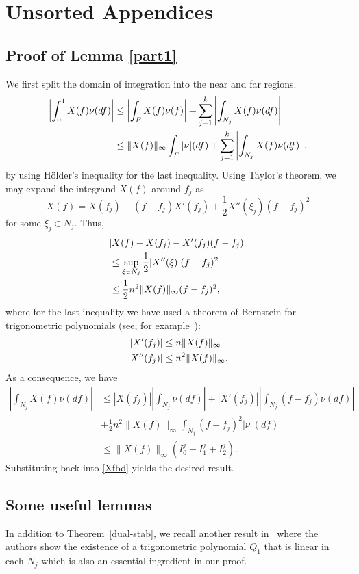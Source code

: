 \section{Unsorted Appendices}
\subsection{Proof of Lemma \ref{part1}}\label{apx:pf:taylor}
We first split the domain of integration into the near and far regions.
\begin{align}
\left |\int_0^1 X(f) \nu(df)\right | 
&\leq \left |\int_F X(f) \nu (f)\right | + \sum_{j=1}^k \left | \int_{N_j}X(f) \nu(df)\right |\nonumber \\
&\leq \lVert X(f)\rVert_\infty \int_F |\nu| (df) + \sum_{j=1}^k \left | \int_{N_j}X(f) \nu(df) \right |.\label{Xfbd}
\end{align}
by using H\"{o}lder's inequality for the last inequality. Using Taylor's theorem, we may expand the integrand $X(f)$ around $f_j$ as
\[
X(f) = X(f_j) + (f-f_j) X'(f_j) + \frac{1}{2} X''(\xi_j) (f-f_j)^2 
\]
for some $\xi_j \in N_j$. 
Thus,
{\small
\begin{align*}
&|X(f)-X(f_j)-X'(f_j)(f-f_j)|\\
&\leq \sup_{\xi \in N_j} \frac{1}{2}|X''(\xi)|(f -f_j)^2\\ &\leq \frac{1}{2} n^2 \lVert X(f)\rVert_\infty(f - f_j)^2, 
\end{align*}
}
where for the last inequality we have used a theorem of Bernstein for trigonometric polynomials (see, for example~\cite{bernstein}):  
\begin{align*}
|X'(f_j)|  & \leq n \lVert X(f)\rVert_\infty\\
|X''(f_j)| & \leq n^2 \lVert X(f)\rVert_\infty.
\end{align*}
As a consequence, we have
\begin{align*}
\left | \int_{N_j} X(f) \nu(df)\right| &\leq \left| X(f_j)\right| \left| \int_{N_j} \nu (df)\right| + \left|X'(f_j)\right| \left|\int_{N_j} (f-f_j) \nu (df)  \right|\\
& + \frac{1}{2} n^2 \|X(f)\|_\infty \int_{N_j} (f-f_j)^2 |\nu| (df) \\
& \leq \|X(f)\|_\infty \left(I_0^j + I_1^j + I_2^j\right).
\end{align*}
Substituting back into \eqref{Xfbd} yields the desired result.

\subsection{Some useful lemmas}
\label{apx:collection}
In addition to Theorem~\ref{dual-stab}, we recall another result in~\cite{cg_noisy} where the authors show the existence of a 
trigonometric polynomial $Q_1$ that is linear in each $N_j$ which is also an essential ingredient in our proof.

